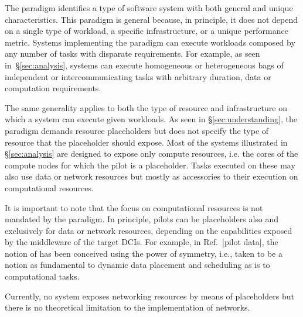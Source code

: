 \documentclass{sig-alternate}
\begin{document}

The \pilot paradigm identifies a type of software system with both general and
unique characteristics. This paradigm is general because, in principle, it does
not depend on a single type of workload, a specific infrastructure, or a unique
performance metric. Systems implementing the \pilot paradigm can execute
workloads composed by any number of tasks with disparate requirements. For
example, as seen in~\S\ref{sec:analysis}, \pilot systems can execute
homogeneous or heterogeneous bags of independent or intercommunicating tasks
with arbitrary duration, data or computation requirements.

The same generality applies to both the type of resource and infrastructure on
which a \pilot system can execute given workloads. As seen in
\S\ref{sec:understanding}, the \pilot paradigm demands resource placeholders
but does not specify the type of resource that the placeholder should expose.
Most of the \pilot systems illustrated in \S\ref{sec:analysis} are designed to
expose only compute resources, i.e. the cores of the compute nodes for which
the pilot is a placeholder. Tasks executed on these \pilots may also use data
or network resources but mostly as accessories to their execution on
computational resources.

It is important to note that the focus on computational resources is not
mandated by the \pilot paradigm. In principle, pilots can be placeholders also
and exclusively for data or network resources, depending on the capabilities
exposed by the middleware of the target DCIs. For example, in Ref.~[pilot
data], the notion of \pilotdata has been conceived using the power of symmetry,
i.e., \pilotdata taken to be a notion as fundamental to dynamic data placement
and scheduling as \pilot is to computational tasks.

Currently, no \pilot system exposes networking resources by means of
placeholders but there is no theoretical limitation to the implementation of
\pilot networks.
\end{document}
